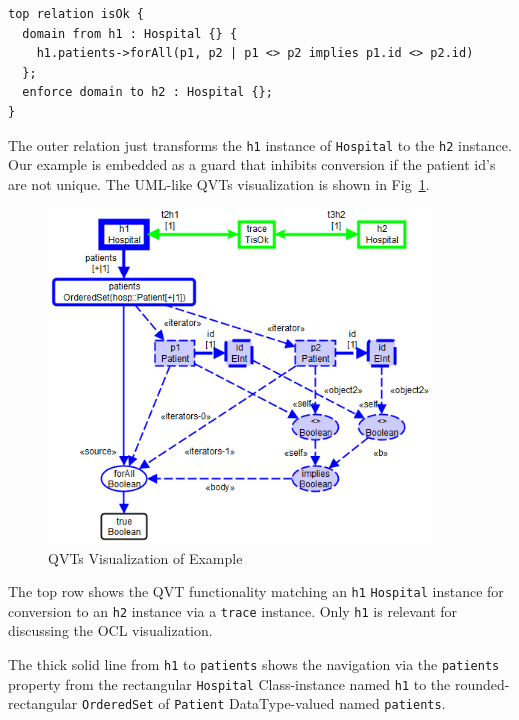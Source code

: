 \documentclass{llncs}
\begin{document}
\begin{verbatim}
top relation isOk {
  domain from h1 : Hospital {} {
    h1.patients->forAll(p1, p2 | p1 <> p2 implies p1.id <> p2.id)
  };
  enforce domain to h2 : Hospital {};
}
\end{verbatim}

The outer relation just transforms the \verb$h1$ instance of \verb$Hospital$ to the \verb$h2$ instance. Our example is embedded as a guard that inhibits conversion if the patient id's are not unique. The UML-like QVTs visualization is shown in Fig~\ref{fig:QVTs}.

\begin{figure}
	\vspace{-10pt}
	\begin{center}
		\includegraphics[width=4.0in]{QVTs.png}
	\end{center}
	\vspace{-10pt}
	\caption{QVTs Visualization of Example}
	\label{fig:QVTs}
	\vspace{-10pt}
\end{figure}

The top row shows the QVT functionality matching an \verb$h1$ \verb$Hospital$ instance for conversion to an \verb$h2$ instance via a \verb$trace$ instance. Only \verb$h1$ is relevant for discussing the OCL visualization.

The thick solid line from \verb$h1$ to \verb$patients$ shows the navigation via the \verb$patients$ property from the rectangular \verb$Hospital$ Class-instance named \verb$h1$ to the rounded-rectangular \verb$OrderedSet$ of \verb$Patient$ DataType-valued named \verb$patients$.
\end{document}
